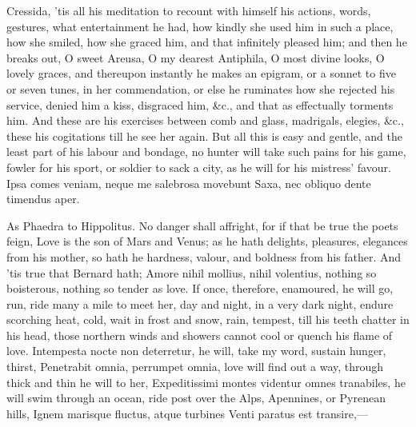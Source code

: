 {Cressida, 'tis all his meditation to recount with himself his actions,
words, gestures, what entertainment he had, how kindly she used him in
such a place, how she smiled, how she graced him, and that infinitely
pleased him; and then he breaks out, O sweet Areusa, O my dearest
Antiphila, O most divine looks, O lovely graces, and thereupon
instantly he makes an epigram, or a sonnet to five or seven tunes, in
her commendation, or else he ruminates how she rejected his service,
denied him a kiss, disgraced him, \&c., and that as effectually torments
him. And these are his exercises between comb and glass, madrigals,
elegies, \&c., these his cogitations till he see her again. But all this
is easy and gentle, and the least part of his labour and bondage, no
hunter will take such pains for his game, fowler for his sport, or
soldier to sack a city, as he will for his mistress' favour.
Ipsa comes veniam, neque me salebrosa movebunt
Saxa, nec obliquo dente timendus aper.

As Phaedra to Hippolitus. No danger shall affright, for if that be true
the poets feign, Love is the son of Mars and Venus; as he hath
delights, pleasures, elegances from his mother, so hath he hardness,
valour, and boldness from his father. And 'tis true that Bernard hath;
Amore nihil mollius, nihil volentius, nothing so boisterous, nothing so
tender as love. If once, therefore, enamoured, he will go, run, ride
many a mile to meet her, day and night, in a very dark night, endure
scorching heat, cold, wait in frost and snow, rain, tempest, till his
teeth chatter in his head, those northern winds and showers cannot cool
or quench his flame of love. Intempesta nocte non deterretur, he will,
take my word, sustain hunger, thirst, Penetrabit omnia, perrumpet
omnia, love will find out a way, through thick and thin he will to her,
Expeditissimi montes videntur omnes tranabiles, he will swim through an
ocean, ride post over the Alps, Apennines, or Pyrenean hills,
Ignem marisque fluctus, atque turbines
Venti paratus est transire,---

}
